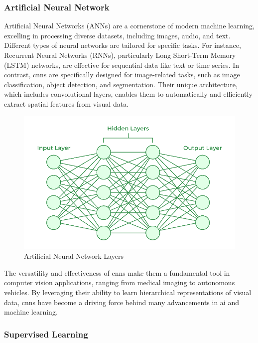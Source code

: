 \subsubsection*{Artificial Neural Network}

Artificial Neural Networks (ANNs) are a cornerstone of modern machine learning, excelling in processing diverse datasets, including images, audio, and text. Different types of neural networks are tailored for specific tasks. For instance, Recurrent Neural Networks (RNNs), particularly Long Short-Term Memory (LSTM) networks, are effective for sequential data like text or time series. In contrast, \glspl{cnn} are specifically designed for image-related tasks, such as image classification, object detection, and segmentation. Their unique architecture, which includes convolutional layers, enables them to automatically and efficiently extract spatial features from visual data. \cite{geeksforgeeks:cnn} \\

\begin{figure}[h!]
    \centering
    \includegraphics[width=0.75\linewidth]{figures//theory/artificial-neural-network.png}
    \caption{Artificial Neural Network Layers}
    \label{fig:artificial-neural-network}
\end{figure}

The versatility and effectiveness of \glspl{cnn} make them a fundamental tool in computer vision applications, ranging from medical imaging to autonomous vehicles. By leveraging their ability to learn hierarchical representations of visual data, \glspl{cnn} have become a driving force behind many advancements in \gls{ai} and machine learning.


\subsubsection*{Supervised Learning}

